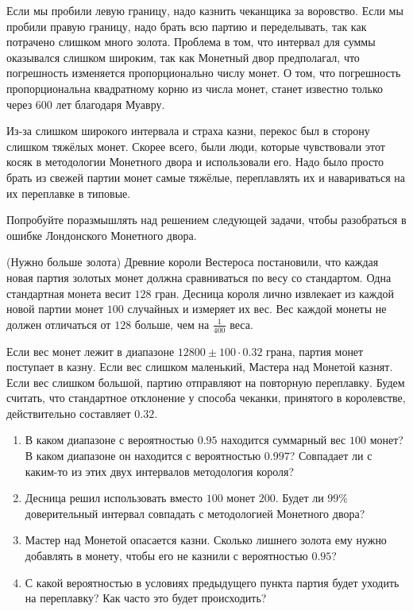 \documentclass[12pt, a4paper, oneside]{article}
\begin{document}
Если мы пробили левую границу, надо казнить чеканщика за воровство. Если мы пробили правую границу, надо брать всю партию и переделывать, так как потрачено слишком много золота. Проблема в том, что интервал для суммы оказывался слишком широким, так как Монетный двор предполагал, что погрешность изменяется пропорционально числу монет. О том, что погрешность пропорциональна квадратному корню из числа монет, станет известно только через $600$ лет благодаря Муавру.

Из-за слишком широкого интервала и страха казни, перекос был в сторону слишком тяжёлых монет. Скорее всего, были люди, которые чувствовали этот косяк в методологии Монетного двора и использовали его. Надо было просто брать из свежей партии монет самые тяжёлые, переплавлять их и навариваться на их переплавке в типовые.  

Попробуйте поразмышлять над решением следующей задачи, чтобы разобраться в ошибке Лондонского Монетного двора. 

\begin{problem}{(Нужно больше золота)}
Древние короли Вестероса постановили, что каждая новая партия золотых монет должна сравниваться по весу со стандартом. Одна стандартная монета весит $128$ гран. Десница короля лично извлекает из каждой новой партии монет $100$ случайных и измеряет их вес. Вес каждой монеты не должен отличаться от $128$ больше, чем на $\frac{1}{400}$ веса.

Если вес монет лежит в диапазоне $12800 \pm 100 \cdot 0.32$ грана, партия монет поступает в казну. Если вес слишком маленький, Мастера над Монетой казнят. Если вес слишком большой, партию отправляют на повторную переплавку. Будем считать, что стандартное отклонение у способа чеканки, принятого в королевстве, действительно составляет $0.32$. 

\begin{enumerate} 
    \item В каком диапазоне с вероятностью $0.95$ находится суммарный вес $100$ монет? В каком диапазоне он находится с вероятностью $0.997$? Совпадает ли с каким-то из этих двух интервалов методология короля?
    
    \item Десница решил использовать вместо $100$ монет $200$. Будет ли $99\%$ доверительный интервал совпадать с методологией Монетного двора? 

    \item Мастер над Монетой опасается казни. Сколько лишнего золота ему нужно добавлять в монету, чтобы его не казнили с вероятностью $0.95$?
    
    \item С какой вероятностью в условиях предыдущего пункта партия будет уходить на переплавку? Как часто это будет происходить? 
\end{enumerate} 
\end{problem}
\end{document}
